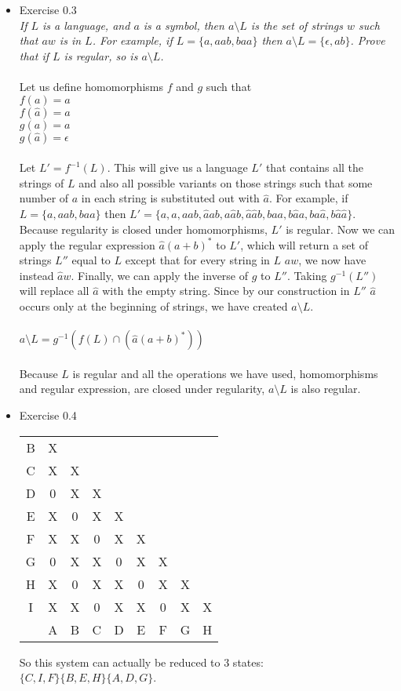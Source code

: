 \documentclass[12pt]{article}
\begin{document}
\begin{itemize}
\item{Exercise 0.3} \\
\emph{If $L$ is a language, and $a$ is a symbol, then $a\setminus L$ is the set of strings $w$ such that $aw$ is in $L$. For example, if $L = \{a, aab, baa\}$ then $a\setminus L = \{\epsilon, ab\}$. Prove that if $L$ is regular, so is
$a\setminus L$.} \\
\\
Let us define homomorphisms $f$ and $g$ such that \\
$f(a) = a$ \\
$f(\hat{a}) = a$ \\
$g(a) = a$ \\
$g(\hat{a}) = \epsilon$ \\
\\
Let $L' = f^{-1}(L)$. This will give us a language $L'$ that contains all the strings of $L$ and also all possible variants on those strings such that some number of $a$ in each string is substituted out with $\hat a$. For example, if $L = \{a, aab, baa\}$ then $L' = \{a, \hat a, aab, \hat aab, a\hat ab, \hat a\hat ab, baa, b\hat aa, ba\hat a, b\hat a\hat a\}$. Because regularity is closed under homomorphisms, $L'$ is regular. Now we can apply the regular expression $\hat a(a+b)^*$ to $L'$, which will return a set of strings $L''$ equal to $L$ except that for every string in $L$ $aw$, we now have instead $\hat aw$. Finally, we can apply the inverse of $g$ to $L''$. Taking $g^{-1}(L'')$ will replace all $\hat a$ with the empty string. Since by our construction in $L''$ $\hat a$ occurs only at the beginning of strings, we have created $a\setminus L$. \\
\\
$a\setminus L = g^{-1}(f(L)\cap (\hat a(a+b)^*))$ \\
\\
Because $L$ is regular and all the operations we have used, homomorphisms and regular expression, are closed under regularity, $a\setminus L$ is also regular.
\item{Exercise 0.4} \\

\begin{tabular}{c| c c c c c c c c}
B & X &  &  &  &  &  &  &  \\
C & X & X &  &  &  &  &  &  \\
D & 0 & X & X &  &  &  &  &  \\
E & X & 0 & X & X &  &  &  &  \\
F & X & X & 0 & X & X &  &  &  \\
G & 0 & X & X & 0 & X & X &  &  \\
H & X & 0 & X & X & 0 & X & X &  \\
I & X & X & 0 & X & X & 0 & X & X \\
\hline
  & A & B & C & D & E & F & G & H
\end{tabular}

So this system can actually be reduced to 3 states: $\{C, I, F\}\{B, E, H\}\{A, D, G\}$.
\end{itemize}
\end{document}
